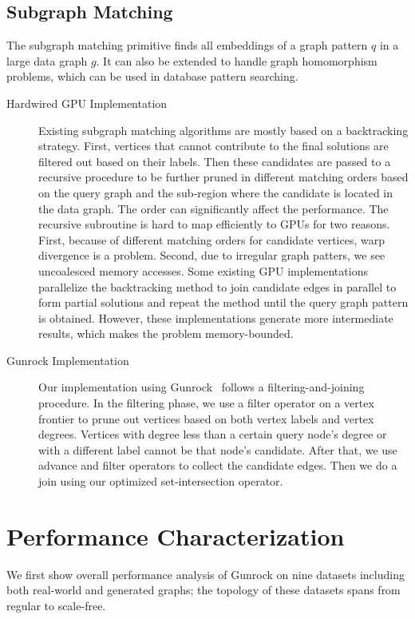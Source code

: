 \documentclass[format=acmsmall,review=false,screen=true]{acmart}
\begin{document}
\subsection{Subgraph Matching}
\label{sec:app:sm}
The subgraph matching primitive finds all embeddings of a graph
pattern $q$ in a large data graph $g$. It can also be extended to
handle graph homomorphism problems, which can be used in database
pattern searching.
\begin{description}
\item[Hardwired GPU Implementation] Existing subgraph matching
  algorithms are mostly based on a backtracking strategy. First,
  vertices that cannot contribute to the final solutions are filtered
  out based on their labels. Then these candidates are passed to a
  recursive procedure to be further pruned in different matching
  orders based on the query graph and the sub-region where the
  candidate is located in the data graph. The order can significantly
  affect the performance. The recursive subroutine is hard to map
  efficiently to GPUs for two reasons. First, because of different
  matching orders for candidate vertices, warp divergence is a
  problem. Second, due to irregular graph patters, we see uncoalesced
  memory accesses. Some existing GPU implementations parallelize the
  backtracking method to join candidate edges in parallel to form
  partial solutions and repeat the method until the query graph
  pattern is obtained. However, these implementations generate more
  intermediate results, which makes the problem memory-bounded.

\item[Gunrock Implementation] Our implementation using
  Gunrock~\cite{Wang:2016:ACS} follows a filtering-and-joining
  procedure. In the filtering phase, we use a filter operator on a
  vertex frontier to prune out vertices based on both vertex labels
  and vertex degrees. Vertices with degree less than a certain query
  node's degree or with a different label cannot be that node's
  candidate. After that, we use advance and filter operators to
  collect the candidate edges. Then we do a join using our optimized
  set-intersection operator.
\end{description}

\section{Performance Characterization}
\label{sec:perf}
We first show overall performance analysis of Gunrock on nine datasets
including both real-world and generated graphs; the topology of these
datasets spans from regular to scale-free.
\end{document}
